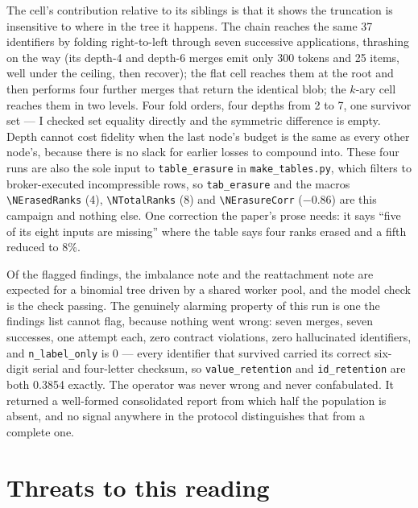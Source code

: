 \documentclass[11pt]{article}
\begin{document}
The cell's contribution relative to its siblings is that it shows the truncation is
insensitive to where in the tree it happens. The chain reaches the same 37 identifiers by
folding right-to-left through seven successive applications, thrashing on the way (its
depth-4 and depth-6 merges emit only 300 tokens and 25 items, well under the ceiling, then
recover); the flat cell reaches them at the root and then performs four further merges
that return the identical blob; the $k$-ary cell reaches them in two levels. Four fold
orders, four depths from 2 to 7, one survivor set --- I checked set equality directly and
the symmetric difference is empty. Depth cannot cost fidelity when the last node's budget
is the same as every other node's, because there is no slack for earlier losses to
compound into. These four runs are also the sole input to \texttt{table\_erasure} in
\texttt{make\_tables.py}, which filters to broker-executed incompressible rows, so
\texttt{tab\_erasure} and the macros \texttt{\textbackslash NErasedRanks} (4),
\texttt{\textbackslash NTotalRanks} (8) and \texttt{\textbackslash NErasureCorr} ($-0.86$)
are this campaign and nothing else. One correction the paper's prose needs: it says ``five
of its eight inputs are missing'' where the table says four ranks erased and a fifth
reduced to 8\%.

Of the flagged findings, the imbalance note and the reattachment note are expected for a
binomial tree driven by a shared worker pool, and the model check is the check passing.
The genuinely alarming property of this run is one the findings list cannot flag, because
nothing went wrong: seven merges, seven successes, one attempt each, zero contract
violations, zero hallucinated identifiers, and \texttt{n\_label\_only} is 0 --- every
identifier that survived carried its correct six-digit serial and four-letter checksum, so
\texttt{value\_retention} and \texttt{id\_retention} are both 0.3854 exactly. The operator
was never wrong and never confabulated. It returned a well-formed consolidated report
from which half the population is absent, and no signal anywhere in the protocol
distinguishes that from a complete one.

\section{Threats to this reading}
\end{document}
